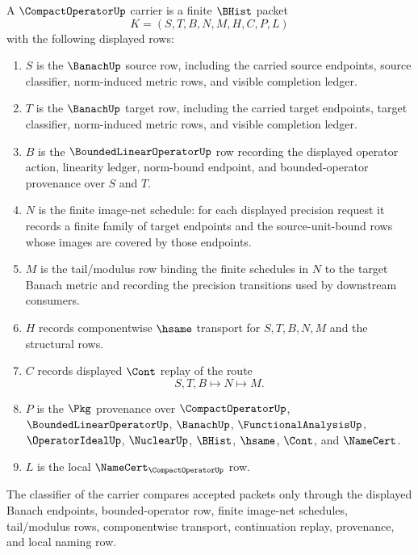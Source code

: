 \begin{definition}
\label{def:compact-operator-carrier}
A $\CompactOperatorUp$ carrier is a finite $\BHist$ packet
$$
K=(S,T,B,N,M,H,C,P,L)
$$
with the following displayed rows:
\begin{enumerate}
\item $S$ is the $\BanachUp$ source row, including the carried source endpoints, source classifier, norm-induced metric rows, and visible completion ledger.
\item $T$ is the $\BanachUp$ target row, including the carried target endpoints, target classifier, norm-induced metric rows, and visible completion ledger.
\item $B$ is the $\BoundedLinearOperatorUp$ row recording the displayed operator action, linearity ledger, norm-bound endpoint, and bounded-operator provenance over $S$ and $T$.
\item $N$ is the finite image-net schedule: for each displayed precision request it records a finite family of target endpoints and the source-unit-bound rows whose images are covered by those endpoints.
\item $M$ is the tail/modulus row binding the finite schedules in $N$ to the target Banach metric and recording the precision transitions used by downstream consumers.
\item $H$ records componentwise $\hsame$ transport for $S,T,B,N,M$ and the structural rows.
\item $C$ records displayed $\Cont$ replay of the route
$$
S,T,B\longmapsto N\longmapsto M .
$$
\item $P$ is the $\Pkg$ provenance over $\CompactOperatorUp$, $\BoundedLinearOperatorUp$, $\BanachUp$, $\FunctionalAnalysisUp$, $\OperatorIdealUp$, $\NuclearUp$, $\BHist$, $\hsame$, $\Cont$, and $\NameCert$.
\item $L$ is the local $\NameCert_{\CompactOperatorUp}$ row.
\end{enumerate}
The classifier of the carrier compares accepted packets only through the displayed Banach endpoints, bounded-operator row, finite image-net schedules, tail/modulus rows, componentwise transport, continuation replay, provenance, and local naming row.
\end{definition}

